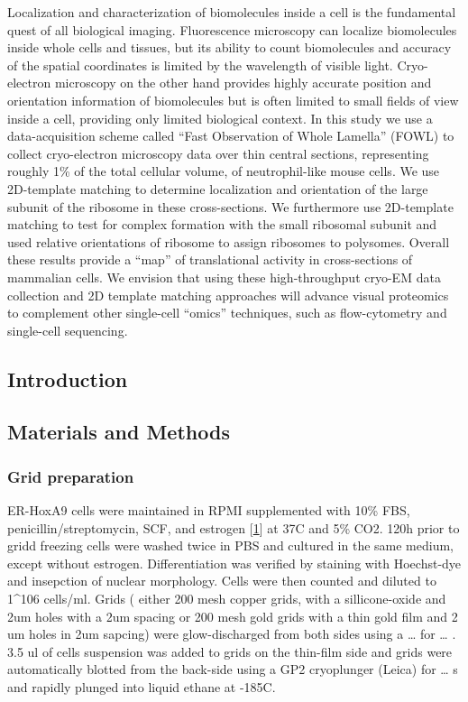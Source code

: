 \documentclass[
]{article}
\begin{document}
Localization and characterization of biomolecules inside a cell is the fundamental quest of all biological imaging. Fluorescence microscopy can localize biomolecules inside whole cells and tissues, but its ability to count biomolecules and accuracy of the spatial coordinates is limited by the wavelength of visible light. Cryo-electron microscopy on the other hand provides highly accurate position and orientation information of biomolecules but is often limited to small fields of view inside a cell, providing only limited biological context. In this study we use a data-acquisition scheme called ``Fast Observation of Whole Lamella'' (FOWL) to collect cryo-electron microscopy data over thin central sections, representing roughly 1\% of the total cellular volume, of neutrophil-like mouse cells. We use 2D-template matching to determine localization and orientation of the large subunit of the ribosome in these cross-sections. We furthermore use 2D-template matching to test for complex formation with the small ribosomal subunit and used relative orientations of ribosome to assign ribosomes to polysomes. Overall these results provide a ``map'' of translational activity in cross-sections of mammalian cells. We envision that using these high-throughput cryo-EM data collection and 2D template matching approaches will advance visual proteomics to complement other single-cell ``omics'' techniques, such as flow-cytometry and single-cell sequencing.

\hypertarget{introduction}{%
\subsection{Introduction}\label{introduction}}

\hypertarget{materials-and-methods}{%
\subsection{Materials and Methods}\label{materials-and-methods}}

\hypertarget{grid-preparation}{%
\subsubsection{Grid preparation}\label{grid-preparation}}

ER-HoxA9 cells were maintained in RPMI supplemented with 10\% FBS, penicillin/streptomycin, SCF, and estrogen {[}\protect\hyperlink{ref-1B9Vt9eYu}{1}{]} at 37C and 5\% CO2. 120h prior to gridd freezing cells were washed twice in PBS and cultured in the same medium, except without estrogen. Differentiation was verified by staining with Hoechst-dye and insepction of nuclear morphology. Cells were then counted and diluted to 1\^{}106 cells/ml. Grids ( either 200 mesh copper grids, with a sillicone-oxide and 2um holes with a 2um spacing or 200 mesh gold grids with a thin gold film and 2 um holes in 2um sapcing) were glow-discharged from both sides using a \ldots{} for \ldots{} . 3.5 ul of cells suspension was added to grids on the thin-film side and grids were automatically blotted from the back-side using a GP2 cryoplunger (Leica) for \ldots{} s and rapidly plunged into liquid ethane at -185C.
\end{document}
